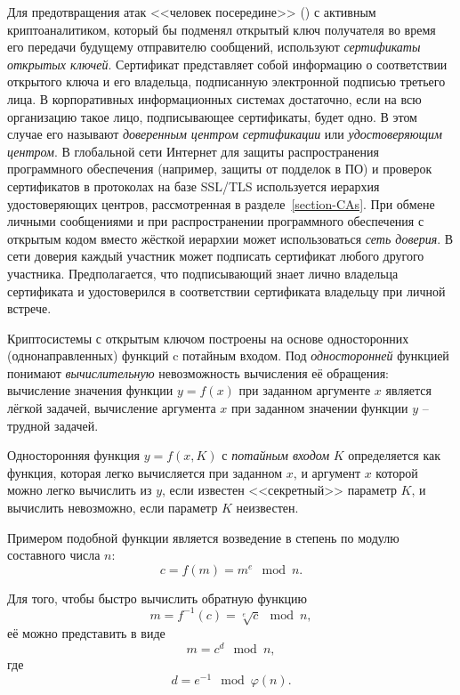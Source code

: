 Для предотвращения атак <<человек посередине>> () с активным криптоаналитиком, который бы подменял открытый ключ получателя во время его передачи будущему отправителю сообщений, используют \emph{сертификаты открытых ключей}. Сертификат представляет собой информацию о соответствии открытого ключа и его владельца, подписанную электронной подписью третьего лица. В корпоративных информационных системах достаточно, если на всю организацию такое лицо, подписывающее сертификаты, будет одно. В этом случае его называют \emph{доверенным центром сертификации} или \emph{удостоверяющим центром}. В глобальной сети Интернет для защиты распространения программного обеспечения (например, защиты от подделок в ПО) и проверок сертификатов в протоколах на базе SSL/TLS используется иерархия удостоверяющих центров, рассмотренная в разделе~\ref{section-CAs}. При обмене личными сообщениями и при распространении программного обеспечения с открытым кодом вместо жёсткой иерархии может использоваться \emph{сеть доверия}. В сети доверия каждый участник может подписать сертификат любого другого участника. Предполагается, что подписывающий знает лично владельца сертификата и удостоверился в соответствии сертификата владельцу при личной встрече.

Криптосистемы с открытым ключом построены на основе односторонних (однонаправленных) функций c потайным входом. Под \emph{односторонней} функцией понимают \emph{вычислительную} невозможность вычисления её обращения: вычисление значения функции $y = f(x)$ при заданном аргументе $x$ является лёгкой задачей, вычисление аргумента $x$ при заданном значении функции $y$ -- трудной задачей.

Односторонняя функция $y = f(x,K)$ с \emph{потайным входом} $K$ определяется как функция, которая легко вычисляется при заданном $x$, и аргумент $x$ которой можно легко вычислить из $y$, если известен <<секретный>> параметр $K$, и вычислить невозможно, если параметр $K$ неизвестен.

Примером подобной функции является возведение в степень по модулю составного числа $n$:
	\[ c = f \left( m \right) = m ^ e \mod n.\]

Для того, чтобы быстро вычислить обратную функцию
	\[ m = f^{-1} \left( c \right) = \sqrt[e]{c} \mod n, \]
её можно представить в виде
	\[ m = c^{d} \mod n,\]
где
	\[ d = e^{-1} \mod \varphi \left( n \right). \]

